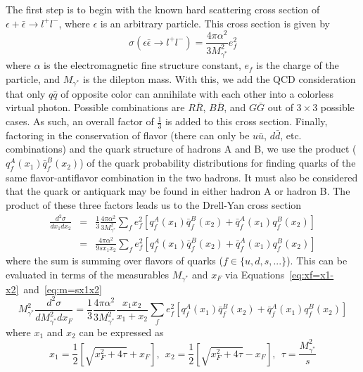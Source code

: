 The first step is to begin with the known hard scattering cross section of $\epsilon + \bar{\epsilon} \rightarrow l^+ l^-$, where $\epsilon$ is an arbitrary particle. This cross section\cite{Halzen:1984mc} is given by
\begin{equation}
\sigma(\epsilon\bar{\epsilon}\rightarrow l^+l^-) = \frac{4 \pi \alpha^2}{3M_{\gamma^*}^2} e_f^2
\label{eq:annihilation-cross}
\end{equation}
where $\alpha$ is the electromagnetic fine structure constant, $e_f$ is the charge of the particle, and $M_{\gamma^*}$ is the dilepton mass. With this, we add the QCD consideration that only $q\bar{q}$ of opposite color can annihilate with each other into a colorless virtual photon. Possible combinations are $R\bar{R}$, $B\bar{B}$, and $G\bar{G}$ out of $3\times 3$ possible cases. As such, an overall factor of $\frac{1}{3}$ is added to this cross section. Finally, factoring in the conservation of flavor (there can only be $u\bar{u}$, $d\bar{d}$, etc. combinations) and the quark structure of hadrons A and B,  we use the product ($q_f^A(x_1)\bar{q}_{f}^B(x_2)$) of the quark probability distributions for finding quarks of the same flavor-antiflavor combination in the two hadrons. It must also be considered that the quark or antiquark may be found in either hadron A or hadron B. The product of these three factors leads us to the Drell-Yan cross section\cite{Drell:1970wh}
\begin{eqnarray}
\frac{d^2\sigma}{dx_1dx_2}&=&\frac{1}{3}\frac{4\pi\alpha^2}{3M_{\gamma^*}^2}
\sum_{f}e_f^2[q_f^A(x_1)\bar{q}_f^B(x_2)+
\bar{q}_f^A(x_1)q_f^B(x_2)]\\
&=&\frac{4\pi\alpha^2}{9 s x_1 x_2}
\sum_{f}e_f^2[q_f^A(x_1)\bar{q}_f^B(x_2)+
\bar{q}_f^A(x_1)q_f^B(x_2)]
\label{eq:DY-cross}
\end{eqnarray}
where the sum is summing over flavors of quarks ($f\in\{u,d,s,...\}$). This can be evaluated in terms of the measurables $M_{\gamma^*}$ and $x_F$ via Equations~\ref{eq:xf=x1-x2}~and~\ref{eq:m=sx1x2}
\begin{equation}
M_{\gamma^*}^2 \frac{d^2\sigma}{dM_{\gamma^*}^2 dx_F} = 
\frac{1}{3}\frac{4\pi\alpha^2}{3M_{\gamma^*}^2}
\frac{x_1 x_2}{x_1 + x_2}
\sum_{f}e_f^2[q_f^A(x_1)\bar{q}_f^B(x_2)+
\bar{q}_f^A(x_1)q_f^B(x_2)]
\label{eq:dy-cs-observe}
\end{equation}
where $x_1$ and $x_2$ can be expressed as
\begin{equation}
x_1 = \frac{1}{2}\left[\sqrt{x_F^2 + 4\tau} + x_F\right],\ \  
x_2 = \frac{1}{2}\left[\sqrt{x_F^2 + 4\tau} - x_F\right],\ \ 
\tau = \frac{M_{\gamma^*}^2}{s}
\end{equation}
